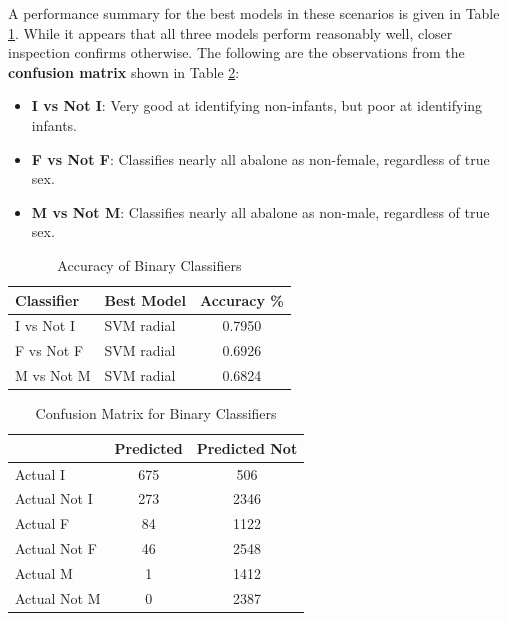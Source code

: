 \documentclass[11pt, a4paper]{article}
\begin{document}
    A performance summary for the best models in these scenarios is given in Table \ref{binary}. While it appears that all three models perform reasonably well, closer inspection confirms otherwise. The following are the observations from the \textbf{confusion matrix} shown in Table \ref{cms}:

    \begin{itemize}
        \item \textbf{I vs Not I}: Very good at identifying non-infants, but poor at identifying infants.
        \item \textbf{F vs Not F}: Classifies nearly all abalone as non-female, regardless of true sex.
        \item \textbf{M vs Not M}: Classifies nearly all abalone as non-male, regardless of true sex.
    \end{itemize}  

    \begin{table}[ht]
        \centering
        \begin{tabular}{|l|l|c|}
            \hline
            Classifier  & Best Model    & Accuracy \% \\
            \hline
            I vs Not I  & SVM radial    & 0.7950 \\
            F vs Not F  & SVM radial    & 0.6926 \\
            M vs Not M  & SVM radial    & 0.6824 \\
            \hline
        \end{tabular}
        \caption{Accuracy of Binary Classifiers}
        \label{binary}
    \end{table}

    \begin{table}
        \centering
        \begin{tabular}{|l|c|c|}
            \hline
                            & Predicted & Predicted Not \\
            \hline
            Actual I        & 675       & 506 \\
            Actual Not I    & 273       & 2346 \\
            \hline
            Actual F        & 84        & 1122 \\
            Actual Not F    & 46        & 2548 \\
            \hline
            Actual M        & 1         & 1412 \\
            Actual Not M    & 0         & 2387 \\
            \hline           
        \end{tabular}
        \caption{Confusion Matrix for Binary Classifiers}
        \label{cms}
    \end{table}
\end{document}
